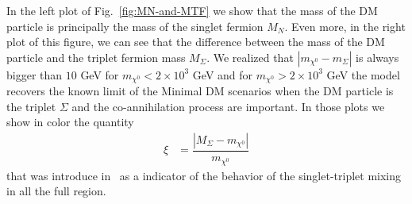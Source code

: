 \documentclass[12pt,letterpaper]{article}
\begin{document}
In the left plot of Fig.~\ref{fig:MN-and-MTF} we show that the mass of the DM particle is principally the mass of the singlet fermion $M_N$. Even more, in the right plot of this figure, we can see that the difference between the mass of the DM particle and the triplet fermion mass $M_{\Sigma}$. 
We realized that $|m_{\chi^0} -m_{\Sigma}|$ is always bigger than $10$ GeV  for $m_{\chi^0}<2\times 10^3$ GeV and for $m_{\chi^0} >2\times 10^3$ GeV the model recovers the known limit of the Minimal DM scenarios when the DM particle is the triplet $\Sigma$ and the co-annihilation process are important. 
In those plots we show in color the quantity
%
\begin{align}
\label{eq:xi}
\xi &=\dfrac{|M_\Sigma - m_{\chi^0}|}{m_{\chi^0}}
\end{align}
%
that was introduce in~\cite{Hirsch:2013ola} as a indicator of the behavior of the singlet-triplet mixing in all the full region.
%
\end{document}

